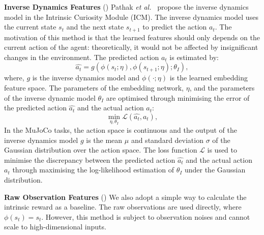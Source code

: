 \noindent\textbf{Inverse Dynamics Features} () Pathak \textit{et al.}~\cite{pathak2017curiosity} propose the inverse dynamics model in the Intrinsic Curiosity Module (ICM). The inverse dynamics model uses the current state $s_{t}$ and the next state $s_{t+1}$ to predict the action $a_{t}$. The motivation of this method is that the learned features should only depends on the current action of the agent: theoretically, it would not be affected by insignificant changes in the environment. The predicted action $a_{t}$ is estimated by:
\begin{equation}
    \widehat{a_{t}} = g(\phi(s_{t};\eta), \phi(s_{t+1};\eta);\theta_{I}),
\end{equation}
where, $g$ is the inverse dynamics model and $\phi(\cdot;\eta)$ is the learned embedding feature space. The parameters of the embedding network, $\eta$, and the parameters of the inverse dynamic model $\theta_{I}$ are optimised through minimising the error of the predicted action $\widehat{a_{t}}$ and the actual action $a_{t}$:
\begin{equation}
    \min_{\eta, \theta_{I}}\mathcal{L}(\widehat{a_{t}}, a_{t}),
\end{equation}
In the MuJoCo tasks, the action space is continuous and the output of the inverse dynamics model $g$ is the mean $\mu$ and standard deviation $\sigma$ of the Gaussian distribution over the action space. The loss function $\mathcal{L}$ is used to minimise the discrepancy between the predicted action $\widehat{a_{t}}$ and the actual action $a_{t}$ through maximising the log-likelihood estimation of $\theta_{I}$ under the Gaussian distribution.

\noindent\textbf{Raw Observation Features} () We also adopt a simple way to calculate the intrinsic reward as a baseline. The raw observations are used directly, where $\phi(s_{t})=s_{t}$. However, this method is subject to observation noises and cannot scale to high-dimensional inputs.

